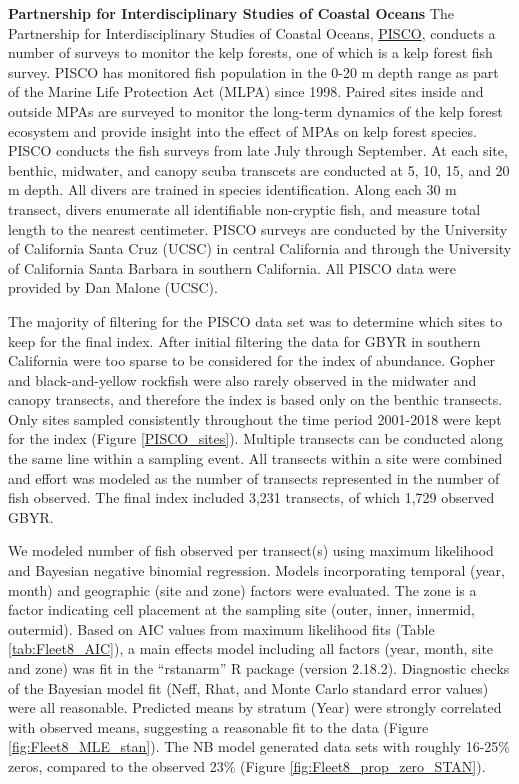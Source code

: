 \documentclass[12pt,]{article}
\begin{document}
\textbf{Partnership for Interdisciplinary Studies of Coastal Oceans} The
Partnership for Interdisciplinary Studies of Coastal Oceans,
\href{http://www.piscoweb.org/kelp-forest-study}{PISCO}, conducts a
number of surveys to monitor the kelp forests, one of which is a kelp
forest fish survey. PISCO has monitored fish population in the 0-20 m
depth range as part of the Marine Life Protection Act (MLPA) since 1998.
Paired sites inside and outside MPAs are surveyed to monitor the
long-term dynamics of the kelp forest ecosystem and provide insight into
the effect of MPAs on kelp forest species. PISCO conducts the fish
surveys from late July through September. At each site, benthic,
midwater, and canopy scuba transcets are conducted at 5, 10, 15, and 20
m depth. All divers are trained in species identification. Along each 30
m transect, divers enumerate all identifiable non-cryptic fish, and
measure total length to the nearest centimeter. PISCO surveys are
conducted by the University of California Santa Cruz (UCSC) in central
California and through the University of California Santa Barbara in
southern California. All PISCO data were provided by Dan Malone (UCSC).

The majority of filtering for the PISCO data set was to determine which
sites to keep for the final index. After initial filtering the data for
GBYR in southern California were too sparse to be considered for the
index of abundance. Gopher and black-and-yellow rockfish were also
rarely observed in the midwater and canopy transects, and therefore the
index is based only on the benthic transects. Only sites sampled
consistently throughout the time period 2001-2018 were kept for the
index (Figure \ref{PISCO_sites}). Multiple transects can be conducted
along the same line within a sampling event. All transects within a site
were combined and effort was modeled as the number of transects
represented in the number of fish observed. The final index included
3,231 transects, of which 1,729 observed GBYR.

We modeled number of fish observed per transect(s) using maximum
likelihood and Bayesian negative binomial regression. Models
incorporating temporal (year, month) and geographic (site and zone)
factors were evaluated. The zone is a factor indicating cell placement
at the sampling site (outer, inner, innermid, outermid). Based on AIC
values from maximum likelihood fits (Table \ref{tab:Fleet8_AIC}), a main
effects model including all factors (year, month, site and zone) was fit
in the ``rstanarm'' R package (version 2.18.2). Diagnostic checks of the
Bayesian model fit (Neff, Rhat, and Monte Carlo standard error values)
were all reasonable. Predicted means by stratum (Year) were strongly
correlated with observed means, suggesting a reasonable fit to the data
(Figure \ref{fig:Fleet8_MLE_stan}). The NB model generated data sets
with roughly 16-25\% zeros, compared to the observed 23\% (Figure
\ref{fig:Fleet8_prop_zero_STAN}).
\end{document}
